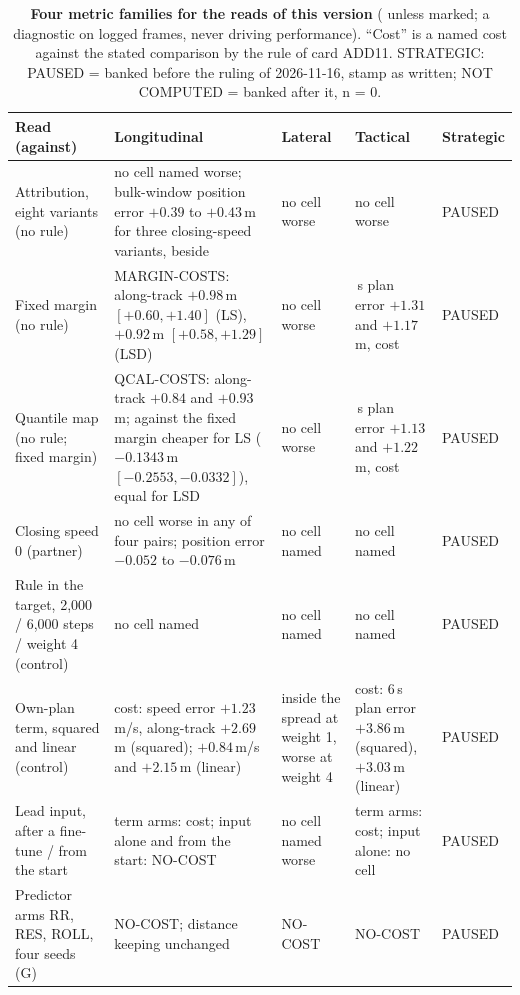 \begin{table}[!tp]
\centering
\caption{\textbf{Four metric families for the reads of this version} ( unless marked; a diagnostic on logged frames, never driving performance). ``Cost'' is a named cost against the stated comparison by the rule of card ADD11. STRATEGIC: PAUSED = banked before the ruling of 2026-11-16, stamp as written; NOT COMPUTED = banked after it, n = 0.}
\label{tab:fam7}
\scriptsize
\begin{tabularx}{\textwidth}{@{}>{\raggedright\arraybackslash}p{33mm}>{\raggedright\arraybackslash}X>{\raggedright\arraybackslash}X>{\raggedright\arraybackslash}X>{\raggedright\arraybackslash}p{19mm}@{}}
\toprule
Read (against) & Longitudinal & Lateral & Tactical & Strategic \\
\midrule
Attribution, eight variants (no rule) & no cell named worse; bulk-window position error $+0.39$ to $+0.43$\,m for three closing-speed variants, beside & no cell worse & no cell worse & PAUSED \\
Fixed margin (no rule) & MARGIN-COSTS: along-track $+0.98$\,m $[+0.60,+1.40]$ (LS), $+0.92$\,m $[+0.58,+1.29]$ (LSD) & no cell worse & 6\,s plan error $+1.31$ and $+1.17$\,m, cost & PAUSED \\
Quantile map (no rule; fixed margin) & QCAL-COSTS: along-track $+0.84$ and $+0.93$\,m; against the fixed margin cheaper for LS ($-0.1343$\,m $[-0.2553,-0.0332]$), equal for LSD & no cell worse & 6\,s plan error $+1.13$ and $+1.22$\,m, cost & PAUSED \\
Closing speed 0 (partner) & no cell worse in any of four pairs; position error $-0.052$ to $-0.076$\,m & no cell named & no cell named & PAUSED \\
Rule in the target, 2,000 / 6,000 steps / weight 4 (control) & no cell named & no cell named & no cell named & PAUSED \\
Own-plan term, squared and linear (control) & cost: speed error $+1.23$\,m/s, along-track $+2.69$\,m (squared); $+0.84$\,m/s and $+2.15$\,m (linear) & inside the spread at weight 1, worse at weight 4 & cost: 6\,s plan error $+3.86$\,m (squared), $+3.03$\,m (linear) & PAUSED \\
Lead input, after a fine-tune / from the start & term arms: cost; input alone and from the start: NO-COST & no cell named worse & term arms: cost; input alone: no cell & PAUSED \\
Predictor arms RR, RES, ROLL, four seeds (G) & NO-COST; distance keeping unchanged & NO-COST & NO-COST & PAUSED \\

\end{tabularx}
\end{table}
